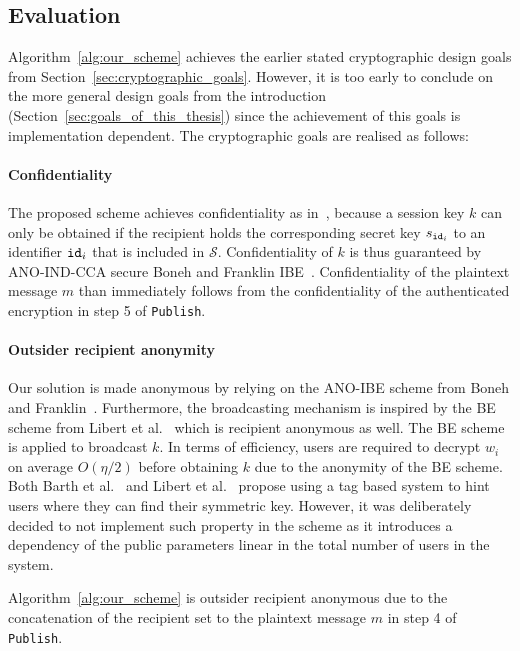\subsection{Evaluation}
Algorithm~\ref{alg:our_scheme} achieves the earlier stated cryptographic design goals from Section~\ref{sec:cryptographic_goals}. However, it is too early to conclude on the more general design goals from the introduction (Section~\ref{sec:goals_of_this_thesis}) since the achievement of this goals is implementation dependent. The cryptographic goals are realised as follows:

\paragraph{Confidentiality} The proposed scheme achieves confidentiality as in~\cite{art:BonehF01,art:LibertPQ12}, because a session key $k$ can only be obtained if the recipient holds the corresponding secret key $s_{\mathtt{id}_{i}}$ to an identifier $\mathtt{id}_{i}$ that is included in $\mathcal{S}$. Confidentiality of $k$ is thus guaranteed by ANO-IND-CCA secure Boneh and Franklin IBE~\cite{art:BonehF01}. Confidentiality of the plaintext message $m$ than immediately follows from the confidentiality of the authenticated encryption in step 5 of \texttt{Publish}.

\paragraph{Outsider recipient anonymity} Our solution is made anonymous by relying on the ANO-IBE scheme from Boneh and Franklin~\cite{art:BonehB04}. Furthermore, the broadcasting mechanism is inspired by the BE scheme from Libert et al.~\cite{art:LibertPQ12} which is recipient anonymous as well. The BE scheme is applied to broadcast $k$. In terms of efficiency, users are required to decrypt $w_i$ on average $O\left( \eta /2 \right)$ before obtaining $k$ due to the anonymity of the BE scheme. Both Barth et al.~\cite{art:BarthBW06} and Libert et al.~\cite{art:LibertPQ12} propose using a tag based system to hint users where they can find their symmetric key. However, it was deliberately decided to not implement such property in the scheme as it introduces a dependency of the public parameters linear in the total number of users in the system.

Algorithm~\ref{alg:our_scheme} is outsider recipient anonymous due to the concatenation of the recipient set to the plaintext message $m$ in step 4 of \texttt{Publish}.

